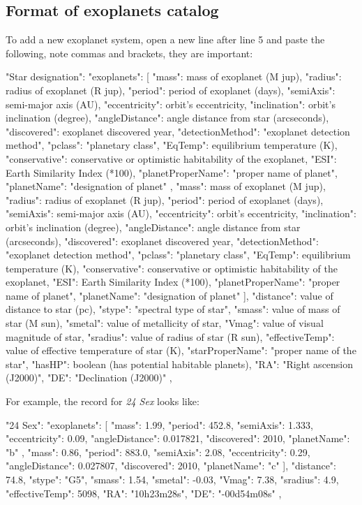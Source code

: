 \subsection{Format of exoplanets catalog}
\label{sec:plugins:Exoplanets:format}

To add a new exoplanet system, open a new line after line 5 and paste the following, note commas and brackets, they are important:

\begin{configfile}[\footnotesize]
"Star designation":
{
	"exoplanets":
	[
	{
		"mass": mass of exoplanet (M jup),
		"radius": radius of exoplanet (R jup),
		"period": period of exoplanet (days),
		"semiAxis": semi-major axis (AU),
		"eccentricity": orbit's eccentricity,
		"inclination": orbit's inclination (degree),
		"angleDistance": angle distance from star 
						(arcseconds),
		"discovered": exoplanet discovered year,
		"detectionMethod": "exoplanet detection method",
		"pclass": "planetary class",
		"EqTemp": equilibrium temperature (K),
		"conservative": conservative or optimistic 
				habitability of the exoplanet,
		"ESI": Earth Similarity Index (*100),
		"planetProperName": "proper name of planet",
		"planetName": "designation of planet"
	},
	{
		"mass": mass of exoplanet (M jup),
		"radius": radius of exoplanet (R jup),
		"period": period of exoplanet (days),
		"semiAxis": semi-major axis (AU),
		"eccentricity": orbit's eccentricity,
		"inclination": orbit's inclination (degree),
		"angleDistance": angle distance from star 
						(arcseconds),
		"discovered": exoplanet discovered year,
		"detectionMethod": "exoplanet detection method",
		"pclass": "planetary class",
		"EqTemp": equilibrium temperature (K),
		"conservative": conservative or optimistic 
				habitability of the exoplanet,
		"ESI": Earth Similarity Index (*100),
		"planetProperName": "proper name of planet",
		"planetName": "designation of planet"
	}
	],
	"distance": value of distance to star (pc),
	"stype": "spectral type of star",
	"smass": value of mass of star (M sun),
	"smetal": value of metallicity of star,
	"Vmag": value of visual magnitude of star,
	"sradius": value of radius of star (R sun),
	"effectiveTemp": value of effective temperature 
	                 of star (K),
	"starProperName": "proper name of the star",
	"hasHP": boolean (has potential habitable planets),
	"RA": "Right ascension (J2000)",
	"DE": "Declination (J2000)"
},
\end{configfile}

\noindent For example, the record for \textit{24 Sex} looks like:
\begin{configfile}
"24 Sex":
{
		"exoplanets":
		[
		{
			"mass": 1.99,
			"period": 452.8,
			"semiAxis": 1.333,
			"eccentricity": 0.09,
			"angleDistance": 0.017821,
			"discovered": 2010,
			"planetName": "b"
		},
		{
			"mass": 0.86,
			"period": 883.0,
			"semiAxis": 2.08,
			"eccentricity": 0.29,
			"angleDistance": 0.027807,
			"discovered": 2010,
			"planetName": "c"
		}
		],
		"distance": 74.8,
		"stype": "G5",
		"smass": 1.54,
		"smetal": -0.03,
		"Vmag": 7.38,
		"sradius": 4.9,
		"effectiveTemp": 5098,
		"RA": "10h23m28s",
		"DE": "-00d54m08s"
},
\end{configfile}



